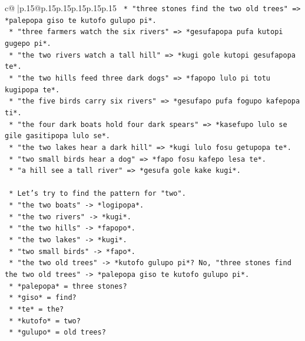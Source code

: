 \documentclass{article}
\begin{document}
{\begin{supertabular}{c@{$\;$}|p{.15\linewidth}@{}p{.15\linewidth}p{.15\linewidth}p{.15\linewidth}p{.15\linewidth}p{.15\linewidth}}
{{{\texttt{                    *   "three stones find the two old trees" => *palepopa giso te kutofo gulupo pi*.} \\
\texttt{                    *   "three farmers watch the six rivers" => *gesufapopa pufa kutopi gugepo pi*.} \\
\texttt{                    *   "the two rivers watch a tall hill" => *kugi gole kutopi gesufapopa te*.} \\
\texttt{                    *   "the two hills feed three dark dogs" => *fapopo lulo pi totu kugipopa te*.} \\
\texttt{                    *   "the five birds carry six rivers" => *gesufapo pufa fogupo kafepopa ti*.} \\
\texttt{                    *   "the four dark boats hold four dark spears" => *kasefupo lulo se gile gasitipopa lulo se*.} \\
\texttt{                    *   "the two lakes hear a dark hill" => *kugi lulo fosu getupopa te*.} \\
\texttt{                    *   "two small birds hear a dog" => *fapo fosu kafepo lesa te*.} \\
\texttt{                    *   "a hill see a tall river" => *gesufa gole kake kugi*.} \\
\\ 
\texttt{            *   Let's try to find the pattern for "two".} \\
\texttt{            *   "the two boats" {-}> *logipopa*.} \\
\texttt{            *   "the two rivers" {-}> *kugi*.} \\
\texttt{            *   "the two hills" {-}> *fapopo*.} \\
\texttt{            *   "the two lakes" {-}> *kugi*.} \\
\texttt{            *   "two small birds" {-}> *fapo*.} \\
\texttt{            *   "the two old trees" {-}> *kutofo gulupo pi*? No, "three stones find the two old trees" {-}> *palepopa giso te kutofo gulupo pi*.} \\
\texttt{                *   *palepopa* = three stones?} \\
\texttt{                *   *giso* = find?} \\
\texttt{                *   *te* = the?} \\
\texttt{                *   *kutofo* = two?} \\
\texttt{                *   *gulupo* = old trees?} \\
}}}
\end{supertabular}}
\end{document}
